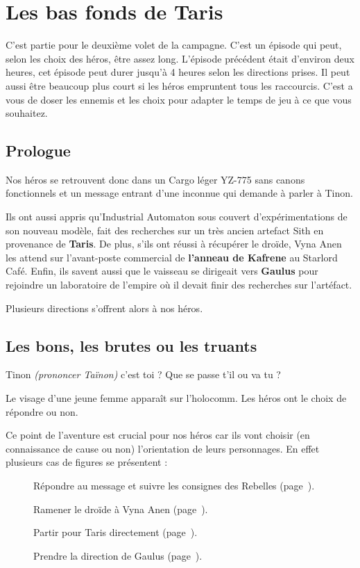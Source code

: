 \section{Les bas fonds de Taris}

C’est partie pour le deuxième volet de la campagne. C’est un épisode qui peut, selon les choix des héros, être assez long. L’épisode précédent était d’environ deux heures, cet épisode peut durer jusqu’à 4 heures selon les directions prises. Il peut aussi être beaucoup plus court si les héros empruntent tous les raccourcis. C’est a vous de doser les ennemis et les choix pour adapter le temps de jeu à ce que vous souhaitez.

\subsection{Prologue}
Nos héros se retrouvent donc dans un Cargo léger YZ-775 sans canons fonctionnels et un message entrant d’une inconnue qui demande à parler à Tinon.
    
Ils ont aussi appris qu’Industrial Automaton sous couvert d’expérimentations de son nouveau modèle, fait des recherches sur un très ancien artefact Sith en provenance de \textbf{Taris}. De plus, s’ils ont réussi à récupérer le droïde, Vyna Anen les attend sur l’avant-poste commercial de \textbf{l’anneau de Kafrene} au Starlord Café. Enfin, ils savent aussi que le vaisseau se dirigeait vers \textbf{Gaulus} pour rejoindre un laboratoire de l’empire où il devait finir des recherches sur l’artéfact.

Plusieurs directions s’offrent alors à nos héros.

\subsection{Les bons, les brutes ou les truants}
\begin{quotebox}
    Tinon \emph{(prononcer Taïnon)} c’est toi ? Que se passe t’il ou va tu ?
\end{quotebox}
Le visage d’une jeune femme apparaît sur l’holocomm. Les héros ont le choix de répondre ou non.

Ce point de l’aventure est crucial pour nos héros car ils vont choisir (en connaissance de cause ou non) l’orientation de leurs personnages. En effet plusieurs cas de figures se présentent :

\begin{description}
    \item[] Répondre au message et suivre les consignes des Rebelles (page~\pageref{sec:les-rebelles}).
    \item[] Ramener le droïde à Vyna Anen (page~\pageref{sec:retour-du-droide}).
    \item[] Partir pour Taris directement (page~\pageref{sec:refus-d-obtemperer}).
    \item[] Prendre la direction de Gaulus (page~\pageref{sec:l-empire}).
\end{description}

